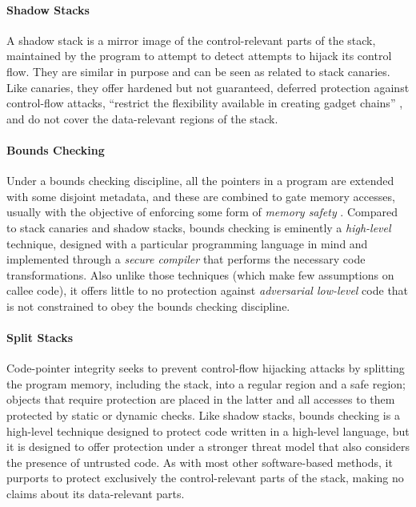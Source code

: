 \paragraph{Shadow Stacks}
%
A shadow stack is a mirror image of the control-relevant parts of the stack,
maintained by the program to attempt to detect attempts to hijack its control
flow. They are similar in purpose and can be seen as related to stack canaries.
Like canaries, they offer hardened but not guaranteed, deferred protection
against control-flow attacks, ``restrict the flexibility available in creating
gadget chains'' \cite{Shanbhogue+19}, and do not cover the data-relevant regions
of the stack.
%

\paragraph{Bounds Checking}
%
Under a bounds checking discipline, all the pointers in a program are extended
with some disjoint metadata, and these are combined to gate memory accesses,
usually with the objective of enforcing some form of \emph{memory
safety} .
%
Compared to stack canaries and shadow stacks, bounds checking is eminently
a \emph{high-level} technique, designed with a particular programming language
in mind and implemented through a \emph{secure compiler} \cite{} that performs
the necessary code transformations. Also unlike those techniques (which make few
assumptions on callee code), it offers little to no protection
against \emph{adversarial low-level} code that is not constrained to obey the
bounds checking discipline.
%


\paragraph{Split Stacks}
%
Code-pointer integrity seeks to prevent control-flow hijacking attacks by
splitting the program memory, including the stack, into a regular region and a
safe region; objects that require protection are placed in the latter and
all accesses to them protected by static or dynamic checks.
%
Like shadow stacks, bounds checking is a high-level technique designed to
protect code written in a high-level language, but it is designed to
offer protection under a stronger threat model that also considers the presence
of untrusted code. As with most other software-based methods, it purports to
protect exclusively the control-relevant parts of the stack, making no claims
about its data-relevant parts.

